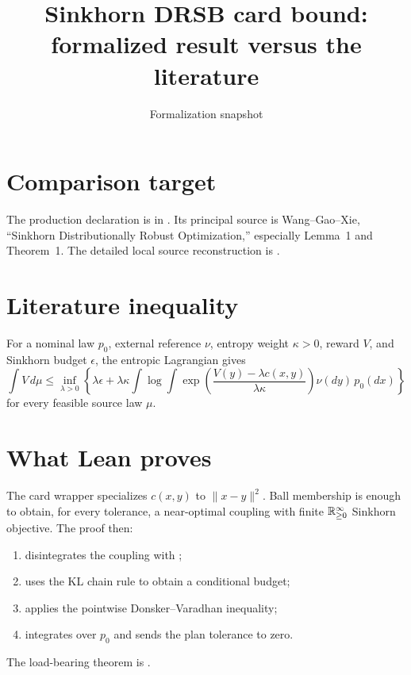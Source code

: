 \title{Sinkhorn DRSB card bound: formalized result versus the literature}
\author{}
\date{Formalization snapshot \snapshot}

\maketitle
{}
\section{Comparison target}
The production declaration is  in
.  Its principal source is Wang--Gao--Xie, ``Sinkhorn Distributionally Robust Optimization,'' especially Lemma~1 and Theorem~1.  The detailed local source reconstruction is
.

\section{Literature inequality}
For a nominal law $p_0$, external reference $\nu$, entropy weight $\kappa>0$, reward $V$, and Sinkhorn budget $\epsilon$, the entropic Lagrangian gives
\[
 \int V\,d\mu
 \le
 \inf_{\lambda>0}\left\{
 \lambda\epsilon+
 \lambda\kappa\int
 \log\int \exp\left(\frac{V(y)-\lambda c(x,y)}{\lambda\kappa}\right)\nu(dy)\,p_0(dx)
 \right\}
\]
for every feasible source law $\mu$.

\section{What Lean proves}
The card wrapper specializes $c(x,y)$ to $\lVert x-y\rVert^2$.  Ball membership is enough to obtain, for every tolerance, a near-optimal coupling with finite $\mathbb{R}_{\ge 0}^{\infty}$ Sinkhorn objective.  The proof then:
\begin{enumerate}[leftmargin=2em]
\item disintegrates the coupling with ;
\item uses the KL chain rule to obtain a conditional budget;
\item applies the pointwise Donsker--Varadhan inequality;
\item integrates over $p_0$ and sends the plan tolerance to zero.
\end{enumerate}
The load-bearing theorem is .

